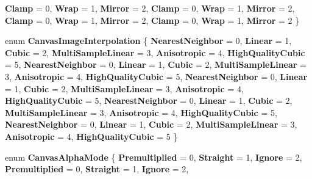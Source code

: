 \begin{DoxyCompactItemize}
{\bfseries Clamp} = 0, 
\newline
{\bfseries Wrap} = 1, 
{\bfseries Mirror} = 2, 
{\bfseries Clamp} = 0, 
{\bfseries Wrap} = 1, 
\newline
{\bfseries Mirror} = 2, 
{\bfseries Clamp} = 0, 
{\bfseries Wrap} = 1, 
{\bfseries Mirror} = 2, 
\newline
{\bfseries Clamp} = 0, 
{\bfseries Wrap} = 1, 
{\bfseries Mirror} = 2
 \}
\item 
\mbox{\label{namespace_microsoft_1_1_graphics_1_1_canvas_abc4f24be9a610e40780a91ad57c2e1c3}} 
enum {\bfseries Canvas\+Image\+Interpolation} \{ \newline
{\bfseries Nearest\+Neighbor} = 0, 
{\bfseries Linear} = 1, 
{\bfseries Cubic} = 2, 
{\bfseries Multi\+Sample\+Linear} = 3, 
\newline
{\bfseries Anisotropic} = 4, 
{\bfseries High\+Quality\+Cubic} = 5, 
{\bfseries Nearest\+Neighbor} = 0, 
{\bfseries Linear} = 1, 
\newline
{\bfseries Cubic} = 2, 
{\bfseries Multi\+Sample\+Linear} = 3, 
{\bfseries Anisotropic} = 4, 
{\bfseries High\+Quality\+Cubic} = 5, 
\newline
{\bfseries Nearest\+Neighbor} = 0, 
{\bfseries Linear} = 1, 
{\bfseries Cubic} = 2, 
{\bfseries Multi\+Sample\+Linear} = 3, 
\newline
{\bfseries Anisotropic} = 4, 
{\bfseries High\+Quality\+Cubic} = 5, 
{\bfseries Nearest\+Neighbor} = 0, 
{\bfseries Linear} = 1, 
\newline
{\bfseries Cubic} = 2, 
{\bfseries Multi\+Sample\+Linear} = 3, 
{\bfseries Anisotropic} = 4, 
{\bfseries High\+Quality\+Cubic} = 5, 
\newline
{\bfseries Nearest\+Neighbor} = 0, 
{\bfseries Linear} = 1, 
{\bfseries Cubic} = 2, 
{\bfseries Multi\+Sample\+Linear} = 3, 
\newline
{\bfseries Anisotropic} = 4, 
{\bfseries High\+Quality\+Cubic} = 5
 \}
\item 
\mbox{\label{namespace_microsoft_1_1_graphics_1_1_canvas_a1ab747c729197befb5d2c28b22e08bc3}} 
enum {\bfseries Canvas\+Alpha\+Mode} \{ \newline
{\bfseries Premultiplied} = 0, 
{\bfseries Straight} = 1, 
{\bfseries Ignore} = 2, 
{\bfseries Premultiplied} = 0, 
\newline
{\bfseries Straight} = 1, 
{\bfseries Ignore} = 2, 

\end{DoxyCompactItemize}
